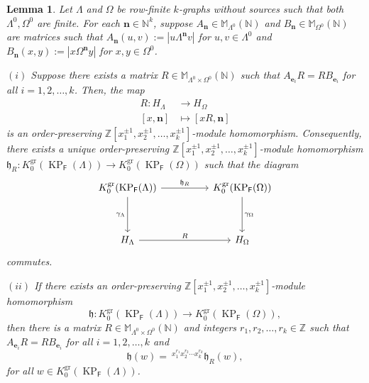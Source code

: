 \documentclass[12pt]{amsart}
\newcommand{\N}{\mathbf{n}}
\newcommand{\KP}{\operatorname{KP}}
\newtheorem{lem}[thm]{Lemma}
\theoremstyle{definition}
\theoremstyle{remark}
\newcommand{\gr}{\operatorname{gr}}
\begin{document}
\begin{lem}\label{lem the connecting matrix R}
Let $\Lambda$ and $\Omega$ be row-finite $k$-graphs without sources such that both $\Lambda^0,\Omega^0$ are finite. For each $\N\in \mathbb{N}^k$, suppose $A_\N\in \mathbb{M}_{\Lambda^0}(\mathbb{N})$ and $B_\N\in \mathbb{M}_{\Omega^0}(\mathbb{N})$ are matrices such that $A_\N(u,v):=|u\Lambda^\N v|$ for $u,v\in \Lambda^0$ and $B_\N(x,y):=|x\Omega^\N y|$ for $x,y\in \Omega^0$. 

$(i)$ Suppose there exists a matrix $R\in \mathbb{M}_{\Lambda^0\times \Omega^0}(\mathbb{N})$ such that $A_{\mathbf{e}_i}R=RB_{\mathbf{e}_i}$ for all $i=1,2,\ldots,k$. Then, the map
\begin{align*}
    R:H_\Lambda &\longrightarrow H_\Omega\\
        [x,\N] &\longmapsto [xR,\N]
\end{align*}
is an order-preserving $\mathbb{Z}[x_1^{\pm 1},x_2^{\pm 1},\ldots,x_k^{\pm 1}]$-module homomorphism. Consequently, there exists a unique order-preserving $\mathbb{Z}[x_1^{\pm 1},x_2^{\pm 1},\ldots,x_k^{\pm 1}]$-module homomorphism $\mathfrak{h}_R:K_0^{\gr}(\KP_{\mathsf{F}}(\Lambda))\longrightarrow K_0^{\gr}(\KP_{\mathsf{F}}(\Omega))$ such that the diagram
\begin{equation}\label{comd1}
\begin{tikzcd}[row sep=huge, column sep=huge]
		K_0^{\gr}(\KP_\mathsf{F}(\Lambda)) \arrow [r, "\mathfrak{h}_R"] \arrow [d, "\gamma_\Lambda"'] & K_0^{\gr}(\KP_\mathsf{F}(\Omega)) \arrow [d, "\gamma_\Omega"] \\
		H_\Lambda \arrow [r, "R"] & H_\Omega
\end{tikzcd}    
\end{equation}
commutes.

$(ii)$ If there exists an order-preserving $\mathbb{Z}[x_1^{\pm 1},x_2^{\pm 1},\ldots,x_k^{\pm 1}]$-module homomorphism \[\mathfrak{h}:K_0^{\gr}(\KP_{\mathsf{F}}(\Lambda))\longrightarrow K_0^{\gr}(\KP_{\mathsf{F}}(\Omega)),\] then there is a matrix $R\in \mathbb{M}_{\Lambda^0\times \Omega^0} (\mathbb{N})$ and integers $r_1,r_2,\ldots,r_k\in \mathbb{Z}$ such that $A_{\mathbf{e}_i}R=RB_{\mathbf{e}_i}$ for all $i=1,2,\ldots,k$ and \[\mathfrak{h}(w)=~^{x_1^{r_1}x_2^{r_2}\cdots x_k^{r_k}} \mathfrak{h}_R(w),\] for all $w\in K_0^{\gr}(\KP_\mathsf{F}(\Lambda))$.
\end{lem}
\end{document}
